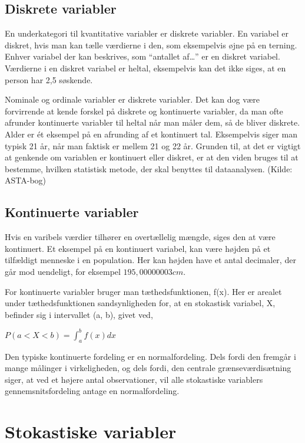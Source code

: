 \documentclass[
]{book}
\theoremstyle{definition}
\theoremstyle{definition}
\theoremstyle{definition}
\theoremstyle{remark}
\begin{document}
\hypertarget{diskrete-variabler}{%
\subsection{Diskrete variabler}\label{diskrete-variabler}}

En underkategori til kvantitative variabler er diskrete variabler. En variabel er diskret, hvis man kan tælle værdierne i den, som eksempelvis øjne på en terning. Enhver variabel der kan beskrives, som ``antallet af\ldots{}'' er en diskret variabel. Værdierne i en diskret variabel er heltal, eksempelvis kan det ikke siges, at en person har 2,5 søskende.

Nominale og ordinale variabler er diskrete variabler. Det kan dog være forvirrende at kende forskel på diskrete og kontinuerte variabler, da man ofte afrunder kontinuerte variabler til heltal når man måler dem, så de bliver diskrete. Alder er ét eksempel på en afrunding af et kontinuert tal. Eksempelvis siger man typisk 21 år, når man faktisk er mellem 21 og 22 år. Grunden til, at det er vigtigt at genkende om variablen er kontinuert eller diskret, er at den viden bruges til at bestemme, hvilken statistisk metode, der skal benyttes til dataanalysen. (Kilde: ASTA-bog)

\hypertarget{kontinuerte-variabler}{%
\subsection{Kontinuerte variabler}\label{kontinuerte-variabler}}

Hvis en varibels værdier tilhører en overtællelig mængde, siges den at være kontinuert. Et eksempel på en kontinuert variabel, kan være højden på et tilfældigt menneske i en population. Her kan højden have et antal decimaler, der går mod uendeligt, for eksempel \(195,00000003 cm\).

For kontinuerte variabler bruger man tæthedsfunktionen, f(x). Her er arealet under tæthedsfunktionen sandsynligheden for, at en stokastisk variabel, X, befinder sig i intervallet (a, b), givet ved,

\(P(a < X < b) = \int_a^b f(x) dx\)

Den typiske kontinuerte fordeling er en normalfordeling. Dels fordi den fremgår i mange målinger i virkeligheden, og dels fordi, den centrale grænseværdisætning siger, at ved et højere antal observationer, vil alle stokastiske variablers gennemsnitsfordeling antage en normalfordeling.

\hypertarget{stokastiske-variabler}{%
\section{Stokastiske variabler}\label{stokastiske-variabler}}
\end{document}
